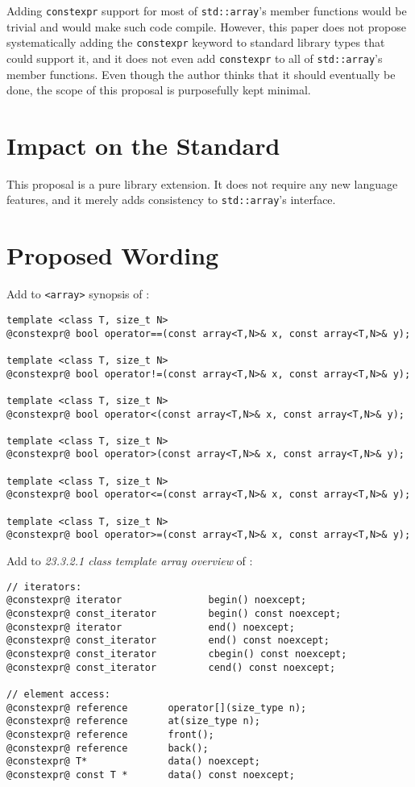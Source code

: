 \documentclass[11pt]{article}
\begin{document}
Adding {\tt constexpr} support for most of {\tt std::array}'s member functions
would be trivial and would make such code compile. However, this paper does not
propose systematically adding the {\tt constexpr} keyword to standard library
types that could support it, and it does not even add {\tt constexpr} to all of
{\tt std::array}'s member functions. Even though the author thinks that it should
eventually be done, the scope of this proposal is purposefully kept minimal.


\section{Impact on the Standard}
This proposal is a pure library extension. It does not require any new
language features, and it merely adds consistency to {\tt std::array}'s
interface.

\section{Proposed Wording}

Add to {\tt <array>} synopsis of \cite{N4296}:

\begin{lstlisting}[style=base]
template <class T, size_t N>
@constexpr@ bool operator==(const array<T,N>& x, const array<T,N>& y);

template <class T, size_t N>
@constexpr@ bool operator!=(const array<T,N>& x, const array<T,N>& y);

template <class T, size_t N>
@constexpr@ bool operator<(const array<T,N>& x, const array<T,N>& y);

template <class T, size_t N>
@constexpr@ bool operator>(const array<T,N>& x, const array<T,N>& y);

template <class T, size_t N>
@constexpr@ bool operator<=(const array<T,N>& x, const array<T,N>& y);

template <class T, size_t N>
@constexpr@ bool operator>=(const array<T,N>& x, const array<T,N>& y);
\end{lstlisting}

Add to \emph{23.3.2.1 class template array overview} of \cite{N4296}:

\begin{lstlisting}[style=base]
// iterators:
@constexpr@ iterator               begin() noexcept;
@constexpr@ const_iterator         begin() const noexcept;
@constexpr@ iterator               end() noexcept;
@constexpr@ const_iterator         end() const noexcept;
@constexpr@ const_iterator         cbegin() const noexcept;
@constexpr@ const_iterator         cend() const noexcept;

// element access:
@constexpr@ reference       operator[](size_type n);
@constexpr@ reference       at(size_type n);
@constexpr@ reference       front();
@constexpr@ reference       back();
@constexpr@ T*              data() noexcept;
@constexpr@ const T *       data() const noexcept;
\end{lstlisting}
\end{document}
